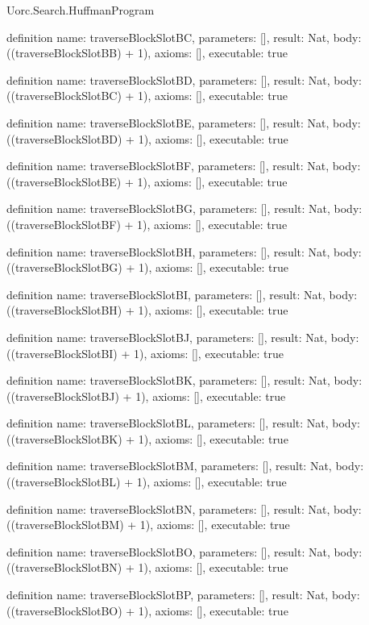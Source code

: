 \begin{lexlean}{Uorc.Search.HuffmanProgram}
\begin{semanticmodule}
definition{
  name: traverseBlockSlotBC,
  parameters: [],
  result: Nat,
  body: ((traverseBlockSlotBB) + 1),
  axioms: [],
  executable: true
}

definition{
  name: traverseBlockSlotBD,
  parameters: [],
  result: Nat,
  body: ((traverseBlockSlotBC) + 1),
  axioms: [],
  executable: true
}

definition{
  name: traverseBlockSlotBE,
  parameters: [],
  result: Nat,
  body: ((traverseBlockSlotBD) + 1),
  axioms: [],
  executable: true
}

definition{
  name: traverseBlockSlotBF,
  parameters: [],
  result: Nat,
  body: ((traverseBlockSlotBE) + 1),
  axioms: [],
  executable: true
}

definition{
  name: traverseBlockSlotBG,
  parameters: [],
  result: Nat,
  body: ((traverseBlockSlotBF) + 1),
  axioms: [],
  executable: true
}

definition{
  name: traverseBlockSlotBH,
  parameters: [],
  result: Nat,
  body: ((traverseBlockSlotBG) + 1),
  axioms: [],
  executable: true
}

definition{
  name: traverseBlockSlotBI,
  parameters: [],
  result: Nat,
  body: ((traverseBlockSlotBH) + 1),
  axioms: [],
  executable: true
}

definition{
  name: traverseBlockSlotBJ,
  parameters: [],
  result: Nat,
  body: ((traverseBlockSlotBI) + 1),
  axioms: [],
  executable: true
}

definition{
  name: traverseBlockSlotBK,
  parameters: [],
  result: Nat,
  body: ((traverseBlockSlotBJ) + 1),
  axioms: [],
  executable: true
}

definition{
  name: traverseBlockSlotBL,
  parameters: [],
  result: Nat,
  body: ((traverseBlockSlotBK) + 1),
  axioms: [],
  executable: true
}

definition{
  name: traverseBlockSlotBM,
  parameters: [],
  result: Nat,
  body: ((traverseBlockSlotBL) + 1),
  axioms: [],
  executable: true
}

definition{
  name: traverseBlockSlotBN,
  parameters: [],
  result: Nat,
  body: ((traverseBlockSlotBM) + 1),
  axioms: [],
  executable: true
}

definition{
  name: traverseBlockSlotBO,
  parameters: [],
  result: Nat,
  body: ((traverseBlockSlotBN) + 1),
  axioms: [],
  executable: true
}

definition{
  name: traverseBlockSlotBP,
  parameters: [],
  result: Nat,
  body: ((traverseBlockSlotBO) + 1),
  axioms: [],
  executable: true
}


\end{semanticmodule}
\end{lexlean}
